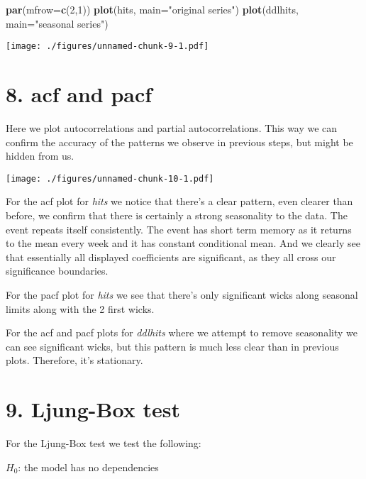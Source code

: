 \documentclass[]{article}
\newenvironment{Shaded}{\begin{snugshade}}{\end{snugshade}}
\newcommand{\DataTypeTok}[1]{\textcolor[rgb]{0.13,0.29,0.53}{#1}}
\newcommand{\DecValTok}[1]{\textcolor[rgb]{0.00,0.00,0.81}{#1}}
\newcommand{\KeywordTok}[1]{\textcolor[rgb]{0.13,0.29,0.53}{\textbf{#1}}}
\newcommand{\NormalTok}[1]{#1}
\newcommand{\StringTok}[1]{\textcolor[rgb]{0.31,0.60,0.02}{#1}}
\begin{document}
\begin{Shaded}
\begin{Highlighting}[]
\KeywordTok{par}\NormalTok{(}\DataTypeTok{mfrow=}\KeywordTok{c}\NormalTok{(}\DecValTok{2}\NormalTok{,}\DecValTok{1}\NormalTok{))}
\KeywordTok{plot}\NormalTok{(hits, }\DataTypeTok{main=}\StringTok{"original series"}\NormalTok{)}
\KeywordTok{plot}\NormalTok{(ddlhits, }\DataTypeTok{main=}\StringTok{"seasonal series"}\NormalTok{)}
\end{Highlighting}
\end{Shaded}

\texttt{[image: ./figures/unnamed-chunk-9-1.pdf]}

\newpage

\hypertarget{acf-and-pacf}{%
\section{8. acf and pacf}\label{acf-and-pacf}}

Here we plot autocorrelations and partial autocorrelations. This way we
can confirm the accuracy of the patterns we observe in previous steps,
but might be hidden from us.

\texttt{[image: ./figures/unnamed-chunk-10-1.pdf]}

For the acf plot for \emph{hits} we notice that there's a clear pattern,
even clearer than before, we confirm that there is certainly a strong
seasonality to the data. The event repeats itself consistently. The
event has short term memory as it returns to the mean every week and it
has constant conditional mean. And we clearly see that essentially all
displayed coefficients are significant, as they all cross our
significance boundaries.

For the pacf plot for \emph{hits} we see that there's only significant
wicks along seasonal limits along with the 2 first wicks.

For the acf and pacf plots for \emph{ddlhits} where we attempt to remove
seasonality we can see significant wicks, but this pattern is much less
clear than in previous plots. Therefore, it's stationary.

\hypertarget{ljung-box-test}{%
\section{9. Ljung-Box test}\label{ljung-box-test}}

For the Ljung-Box test we test the following:

\(H_0\): the model has no dependencies
\end{document}
